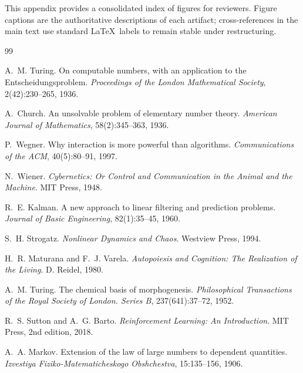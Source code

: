 \documentclass[11pt]{article}
\begin{document}
\listoffigures

\noindent
This appendix provides a consolidated index of figures for reviewers. Figure captions are
the authoritative descriptions of each artifact; cross-references in the main text use
standard \LaTeX\ labels to remain stable under restructuring.


\begin{thebibliography}{99}

A.~M. Turing.
\newblock On computable numbers, with an application to the {E}ntscheidungsproblem.
\newblock \emph{Proceedings of the London Mathematical Society}, 2(42):230--265, 1936.

A.~Church.
\newblock An unsolvable problem of elementary number theory.
\newblock \emph{American Journal of Mathematics}, 58(2):345--363, 1936.

P.~Wegner.
\newblock Why interaction is more powerful than algorithms.
\newblock \emph{Communications of the ACM}, 40(5):80--91, 1997.

N.~Wiener.
\newblock \emph{Cybernetics: Or Control and Communication in the Animal and the Machine}.
\newblock MIT Press, 1948.

R.~E. Kalman.
\newblock A new approach to linear filtering and prediction problems.
\newblock \emph{Journal of Basic Engineering}, 82(1):35--45, 1960.

S.~H. Strogatz.
\newblock \emph{Nonlinear Dynamics and Chaos}.
\newblock Westview Press, 1994.

H.~R. Maturana and F.~J. Varela.
\newblock \emph{Autopoiesis and Cognition: The Realization of the Living}.
\newblock D. Reidel, 1980.

A.~M. Turing.
\newblock The chemical basis of morphogenesis.
\newblock \emph{Philosophical Transactions of the Royal Society of London. Series B},
237(641):37--72, 1952.

R.~S. Sutton and A.~G. Barto.
\newblock \emph{Reinforcement Learning: An Introduction}.
\newblock MIT Press, 2nd edition, 2018.

A.~A. Markov.
\newblock Extension of the law of large numbers to dependent quantities.
\newblock \emph{Izvestiya Fiziko-Matematicheskogo Obshchestva}, 15:135--156, 1906.

\end{thebibliography}
\end{document}

